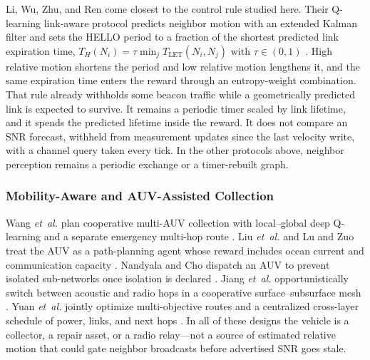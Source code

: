 Li, Wu, Zhu, and Ren come closest to the control rule studied here.
Their Q-learning link-aware protocol predicts neighbor motion with an
extended Kalman filter and sets the HELLO period to a fraction of the
shortest predicted link expiration time,
$T_H(N_i)=\tau\min_j T_{\mathrm{LET}}(N_i,N_j)$ with
$\tau\in(0,1)$ \cite{li2025qlar}.
High relative motion shortens the period and low relative motion
lengthens it, and the same expiration time enters the reward through
an entropy-weight combination.
That rule already withholds some beacon traffic while a
geometrically predicted link is expected to survive.
It remains a periodic timer scaled by link lifetime, and it spends
the predicted lifetime inside the reward.
It does not compare an SNR forecast, withheld from measurement
updates since the last velocity write, with a channel query taken
every tick.
In the other protocols above, neighbor perception remains a periodic
exchange or a timer-rebuilt graph.

\subsubsection{Mobility-Aware and AUV-Assisted Collection}
Wang \emph{et~al.} plan cooperative multi-AUV collection with
local--global deep Q-learning and a separate emergency multi-hop
route \cite{wang2024lgdqn}.
Liu \emph{et~al.} and Lu and Zuo treat the AUV as a path-planning
agent whose reward includes ocean current and communication capacity
\cite{liu2025mdqn,lu2025wper}.
Nandyala and Cho dispatch an AUV to prevent isolated sub-networks
once isolation is declared \cite{nandyala2025isolated}.
Jiang \emph{et~al.} opportunistically switch between acoustic and
radio hops in a cooperative surface--subsurface mesh
\cite{jiang2023hybrid}.
Yuan \emph{et~al.} jointly optimize multi-objective routes and a
centralized cross-layer schedule of power, links, and next hops
\cite{yuan2024multiobj,yuan2024crosslayer}.
In all of these designs the vehicle is a collector, a repair asset,
or a radio relay---not a source of estimated relative motion that
could gate neighbor broadcasts before advertised SNR goes stale.

